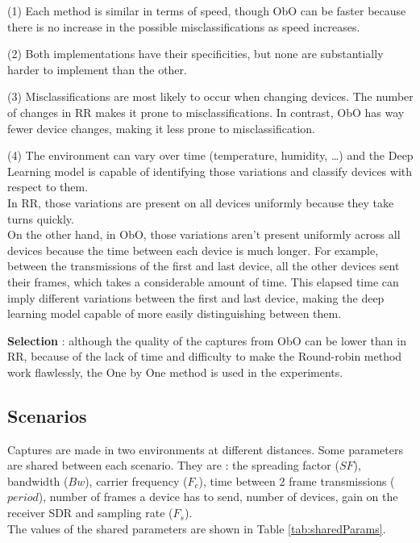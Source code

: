 \documentclass[a4paper, 12pt]{article}
\begin{document}
(1) Each method is similar in terms of speed, though ObO can be faster because there is no increase in the possible misclassifications as speed increases. 

(2) Both implementations have their specificities, but none are substantially harder to implement than the other.

(3) Misclassifications are most likely to occur when changing devices. The number of changes in RR makes it prone to misclassifications. In contrast, ObO has way fewer device changes, making it less prone to misclassification.

(4) The environment can vary over time (temperature, humidity, \dots) and the Deep Learning model is capable of identifying those variations and classify devices with respect to them.\\
In RR, those variations are present on all devices uniformly because they take turns quickly. \\
On the other hand, in ObO, those variations aren't present uniformly across all devices because the time between each device is much longer.
For example, between the transmissions of the first and last device, all the other devices sent their frames, which takes a considerable amount of time. This elapsed time can imply different variations between the first and last device, making the deep learning model capable of more easily distinguishing between them.

\textbf{Selection} : although the quality of the captures from ObO can be lower than in RR, because of the lack of time and difficulty to make the Round-robin method work flawlessly, the One by One method is used in the experiments.


\subsection{Scenarios} \label{scenario}
Captures are made in two environments at different distances.
Some parameters are shared between each scenario. They are : the spreading factor ($SF$), bandwidth ($Bw$), carrier frequency ($F_c$), time between 2 frame transmissions ($period$), number of frames a device has to send, number of devices, gain on the receiver SDR and sampling rate ($F_s$). \\
The values of the shared parameters are shown in Table \ref{tab:sharedParams}.
\end{document}
